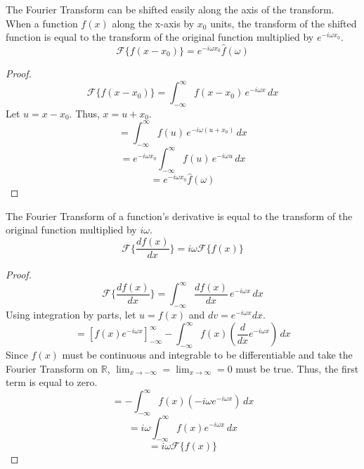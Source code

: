 
\begin{theorem}
    \label{fourier_shift}
    The Fourier Transform can be shifted easily along the axis of the transform. When a function \(f(x)\) along the x-axis by \(x_0\) units, the transform of the shifted function is equal to the transform of the original function multiplied by $e^{-i \omega x_0}$.
    \begin{equation}
        \mathcal{F}\{ f(x - x_0) \} = e^{-i \omega x_0} \hat{f}(\omega)
    \end{equation}
\end{theorem}

\begin{proof}
    \[ \mathcal{F}\{ f(x - x_0) \} = \int_{-\infty}^{\infty} f(x - x_0) \, e^{-i \omega x} \,dx \]
    Let \(u = x - x_0\). Thus, \(x = u + x_0\).
    \[ = \int_{-\infty}^{\infty} f(u) \, e^{-i \omega (u + x_0)} \,dx \]
    \[ = e^{-i \omega x_0} \int_{-\infty}^{\infty} f(u) \, e^{-i \omega u} \,dx \]
    \[ = e^{-i \omega x_0} \hat{f}(\omega) \]
\end{proof}

\begin{theorem}
    \label{fourier_derivative}
    The Fourier Transform of a function's derivative is equal to the transform of the original function multiplied by $i \omega$.
    \begin{equation}
        \mathcal{F}\{ \frac{d f(x)}{dx} \} = i \omega \mathcal{F}\{ f(x) \}
    \end{equation}
\end{theorem}

\begin{proof}
    \[ \mathcal{F}\{ \frac{d f(x)}{dx} \} = \int_{-\infty}^{\infty} \frac{d f(x)}{dx}  \, e^{-i \omega x} \,dx \]
    Using integration by parts, let \(u = f(x)\) and \(dv = e^{-i \omega x} dx\).
    \[ = \left[ f(x) e^{-i \omega x} \right]_{-\infty}^{\infty} - \int_{-\infty}^{\infty} f(x) \left( \frac{d}{dx} e^{-i \omega x} \right) \,dx \]
    Since \(f(x)\) must be continuous and integrable to be differentiable and take the Fourier Transform on \(\mathbb{R}\), \(\lim_{x \to -\infty}=\lim_{x \to \infty}=0\) must be true. Thus, the first term is equal to zero. 
    \[ = - \int_{-\infty}^{\infty} f(x) \left( -i \omega e^{-i \omega x} \right) \,dx \]
    \[ = i \omega \int_{-\infty}^{\infty} f(x) e^{-i \omega x} \,dx \]
    \[ = i \omega \mathcal{F}\{ f(x) \} \]
\end{proof}